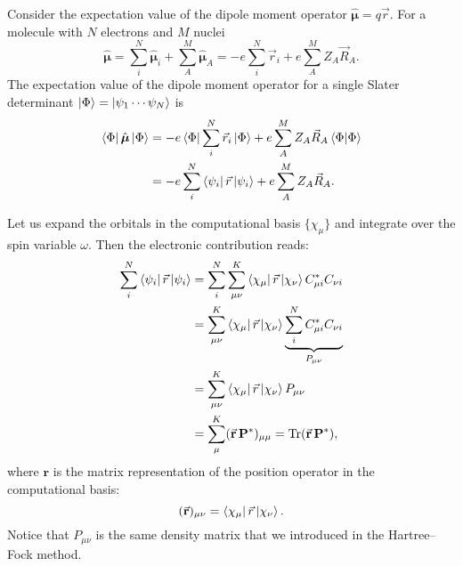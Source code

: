 \documentclass[../Main/chem532-notes.tex]{subfiles}
\begin{document}
\begin{example}
Consider the expectation value of the dipole moment operator $\hat{\boldsymbol{\mu}} = q \vec{r}$. For a molecule with $N$ electrons and $M$ nuclei
\begin{equation}
\hat{\boldsymbol{\mu}} = \sum_i^N \hat{\boldsymbol{\mu}}_i + \sum_A^M \hat{\boldsymbol{\mu}}_A = -e \sum_i^N \vec{r}_i + e \sum_A^M Z_A \vec{R}_A.
\end{equation}
The expectation value of the dipole moment operator for a single Slater determinant $\ket{\Phi} = \ket{\psi_1 \cdots \psi_N}$ is
\begin{equation}
\begin{split}
\bra{\Phi} \hat{\boldsymbol{\mu}} \ket{\Phi}
&=-e \bra{\Phi} \sum_i^N \vec{r}_i  \ket{\Phi} 
+ e \sum_A^M Z_A \vec{R}_A \braket{\Phi|\Phi}\\
&= -e \sum_i^N \bra{\psi_i}\vec{r}\ket{\psi_i} + e \sum_A^M Z_A \vec{R}_A.
\end{split}
\end{equation}

Let us expand the orbitals in the computational basis $\{\chi_\mu\}$ and integrate over the spin variable $\omega$. Then the electronic contribution reads:
\begin{equation}
\begin{split}
\sum_i^N \bra{\psi_i}\vec{r}\ket{\psi_i}
&= \sum_i^N \sum_{\mu\nu}^{K} \bra{\chi_\mu}\vec{r}\ket{\chi_\nu} C_{\mu i}^* C_{\nu i}\\
&= \sum_{\mu\nu}^{K} \bra{\chi_\mu}\vec{r}\ket{\chi_\nu} \underbrace{\sum_i^N C_{\mu i}^* C_{\nu i}}_{P_{\mu\nu}}\\
&= \sum_{\mu\nu}^{K} \bra{\chi_\mu}\vec{r}\ket{\chi_\nu} P_{\mu\nu}\\
&= \sum_\mu^K (\vec{\mathbf{r}}\,\mathbf{P}^*)_{\mu\mu} = \mathrm{Tr}(\vec{\mathbf{r}}\,\mathbf{P}^*),
\end{split}
\end{equation}
where $\mathbf{r}$ is the matrix representation of the position operator in the computational basis:
\begin{equation}
(\vec{\mathbf{r}})_{\mu\nu} = \bra{\chi_\mu}\vec{r}\ket{\chi_\nu}.
\end{equation}
Notice that $P_{\mu\nu}$ is the same density matrix that we introduced in the Hartree--Fock method.
\end{example}
\end{document}
